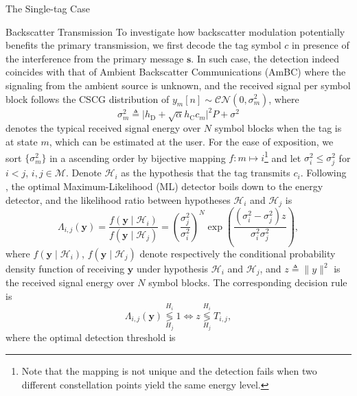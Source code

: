 \documentclass[journal]{IEEEtran}
\begin{document}
\begin{section}{The Single-tag Case}
		\begin{subsection}{Backscatter Transmission}
			To investigate how backscatter modulation potentially benefits the primary transmission, we first decode the tag symbol $c$ in presence of the interference from the primary message $\boldsymbol{s}$. In such case, the detection indeed coincides with that of Ambient Backscatter Communications (AmBC) where the signaling from the ambient source is unknown, and the received signal per symbol block follows the CSCG distribution of $y_m[n] \sim \mathcal{CN}(0,\sigma_m^2)$, where
			\begin{equation}
				\sigma_m^2 \triangleq \lvert h_{\mathrm{D}} + \sqrt{\alpha} h_{\mathrm{C}} c_m \rvert^2 P + \sigma^2
				\label{eq:typical_energy}
			\end{equation}
			denotes the typical received signal energy over $N$ symbol blocks when the tag is at state $m$, which can be estimated at the user. For the ease of exposition, we sort $\{\sigma_m^2\}$ in a ascending order by bijective mapping $f \colon m \mapsto i$\footnote{Note that the mapping is not unique and the detection fails when two different constellation points yield the same energy level.} and let $\sigma_i^2 \le \sigma_j^2$ for $i < j$, $i,j \in \mathcal{M}$. Denote $\mathcal{H}_i$ as the hypothesis that the tag transmits $c_i$. Following \cite{Qian2019}, the optimal Maximum-Likelihood (ML) detector boils down to the energy detector, and the likelihood ratio between hypotheses $\mathcal{H}_i$ and $\mathcal{H}_j$ is
			\begin{equation}
				\Lambda_{i, j}(\boldsymbol{y}) = \frac{f(\boldsymbol{y} \mid \mathcal{H}_i)}{f(\boldsymbol{y} \mid \mathcal{H}_j)} = \left( \frac{\sigma_j^2}{\sigma_i^2} \right)^N \exp \left( \frac{(\sigma_i^2 - \sigma_j^2) z}{\sigma_i^2 \sigma_j^2} \right),
			\end{equation}
			where $f(\boldsymbol{y} \mid \mathcal{H}_i)$, $f(\boldsymbol{y} \mid \mathcal{H}_j)$ denote respectively the conditional probability density function of receiving $\boldsymbol{y}$ under hypothesis $\mathcal{H}_i$ and $\mathcal{H}_j$, and $z \triangleq \lVert y \rVert^2$ is the received signal energy over $N$ symbol blocks. The corresponding decision rule is
			\begin{equation}
				\Lambda_{i, j}(\boldsymbol{y}) \underset{H_j}{\overset{H_i}{\lessgtr}} 1 \iff z \underset{H_j}{\overset{H_i}{\lessgtr}} T_{i, j},
			\end{equation}
			where the optimal detection threshold is
			\begin{equation}

\end{equation}
\end{subsection}
\end{section}
\end{document}
